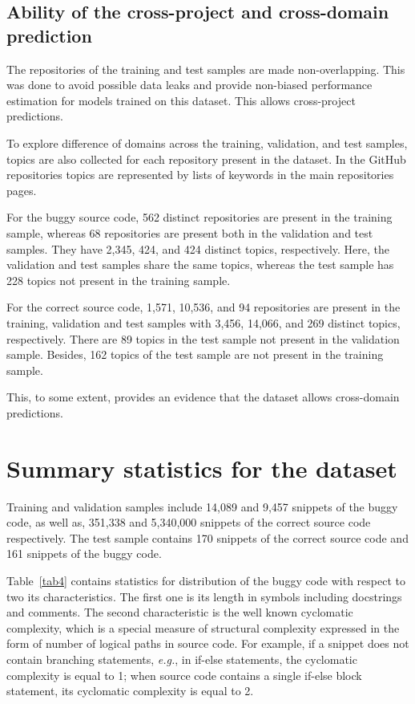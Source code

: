 \documentclass[10pt,conference]{IEEEtran}
\begin{document}
\subsection{Ability of the cross-project and cross-domain prediction}

The repositories of the training and test samples are made non-overlapping. 
This was done to avoid possible data leaks and provide non-biased performance estimation for models trained on this dataset.
This allows cross-project predictions. 

To explore difference of domains across the training, validation, and test samples, topics are also collected for each repository present in the dataset.
In the GitHub repositories topics are represented by lists of keywords in the main repositories pages.

For the buggy source code, 562 distinct repositories are present in the training sample, whereas 68 repositories are present both in the validation and test samples.
They have 2,345, 424, and 424 distinct topics, respectively. Here, the validation and test samples share the same topics, whereas the  test sample has 228 topics not present in
the training sample.

For the correct source code, 1,571, 10,536, and 94 repositories are present in the training, validation and test samples 
with 3,456, 14,066, and 269 distinct topics, respectively. There are 89 topics in the test sample not present in the validation sample.
Besides, 162 topics of the test sample are not present in the training sample. 

This, to some extent, provides an evidence that
the dataset allows cross-domain predictions.


\section{Summary statistics for the dataset}\label{sec5}

Training and validation samples include 14,089 and 9,457 snippets of the buggy code, as well as, 
351,338 and 5,340,000 snippets of the correct source code respectively. The test sample contains 
170 snippets of the correct source code and 161 snippets of the buggy code.

Table~\ref{tab4} contains statistics for distribution of the buggy code with respect to two its characteristics. The first one is its length in symbols including docstrings and comments.
The second characteristic is the well known cyclomatic complexity, which is a special measure of structural complexity expressed in the form of number of logical paths in source code.
For example, if a snippet does not contain branching statements, \textit{e.g.}, in if-else statements, the cyclomatic complexity is equal to 1; when source code contains a single if-else block statement,
its cyclomatic complexity is equal to 2.
\end{document}
